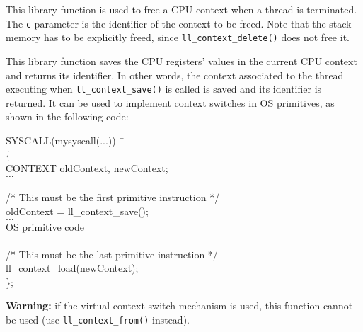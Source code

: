 \documentclass[a4paper]{report}
\begin{document}

This library function is used to free a CPU context when a thread is
terminated. The {\tt c} parameter is the identifier of the context to
be freed. Note that the stack memory has to be explicitly freed, since
{\tt ll\_context\_delete()} does not free it.


This library function saves the CPU registers' values in the current
CPU context and returns its identifier. In other words, the context
associated to the thread executing when {\tt ll\_context\_save()} is
called is saved and its identifier is returned. It can be used to
implement context switches in OS primitives, as shown in the
following code:

\begin{minipage}[t]{15cm}
\begin{tt}
\begin{tabbing}
SYSCALL(mysyscall(...)) \=\                             \\
\{                                                      \\
\>      CONTEXT oldContext, newContext;                 \\
\>      $\ldots$                                        \\
							\\
/* This must be the first primitive instruction */      \\
\>      oldContext = ll\_context\_save();               \\
\>      $\ldots$                                        \\
\>	OS primitive code				\\
							\\
/* This must be the last primitive instruction */       \\
\>      ll\_context\_load(newContext);                  \\
\};                                                     \\
\end{tabbing}
\end{tt}
\end{minipage}

{\bf Warning:} if the virtual context switch mechanism is used, this
function cannot be used (use {\tt ll\_context\_from()} instead).

\end{document}
